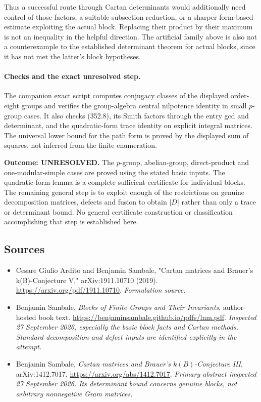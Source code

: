 \documentclass[11pt]{article}
\begin{document}
Thus a successful route through Cartan determinants would additionally
need control of those factors, a suitable subsection reduction, or a
sharper form-based estimate exploiting the actual block. Replacing
their product by their maximum is not an inequality in the helpful
direction. The artificial family above is also not a counterexample
to the established determinant theorem for actual blocks, since it
has not met the latter's block hypotheses.

\paragraph{Checks and the exact unresolved step.}
The companion exact script computes conjugacy classes of the displayed
order-eight groups and verifies the group-algebra central nilpotence
identity in small $p$-group cases. It also checks (352.8), its Smith
factors through the entry gcd and determinant, and the quadratic-form
trace identity on explicit integral matrices. The universal lower bound
for the path form is proved by the displayed sum of squares, not
inferred from the finite enumeration.

\textbf{Outcome: UNRESOLVED.} The $p$-group, abelian-group, direct-product
and one-modular-simple cases are proved using the stated basic inputs.
The quadratic-form lemma is a complete sufficient certificate for
individual blocks. The remaining general step is to exploit enough
of the restrictions on genuine decomposition matrices, defects and
fusion to obtain $|D|$ rather than only a trace or determinant bound.
No general certificate construction or classification accomplishing
that step is established here.

\subsection{Sources}
\begin{itemize}
\item[S1]Cesare Giulio Ardito and Benjamin Sambale, "Cartan matrices and Brauer's k(B)-Conjecture V," arXiv:1911.10710 (2019).
\url{https://arxiv.org/pdf/1911.10710}.
\textit{Formulation source.}
\item[E1]Benjamin Sambale, \emph{Blocks of Finite Groups and Their
Invariants}, author-hosted book text.
\url{https://benjaminsambale.github.io/pdfs/lnm.pdf}.
\textit{Inspected 27 September 2026, especially the basic block facts
and Cartan methods. Standard decomposition and defect inputs are
identified explicitly in the attempt.}
\item[E2]Benjamin Sambale, \emph{Cartan matrices and Brauer's
$k(B)$-Conjecture III}, arXiv:1412.7017.
\url{https://arxiv.org/abs/1412.7017}.
\textit{Primary abstract inspected 27 September 2026. Its determinant
bound concerns genuine blocks, not arbitrary nonnegative Gram matrices.}
\end{itemize}
\end{document}
